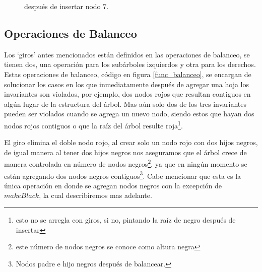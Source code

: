 \begin{figure}
\centering
\captionsetup{justification=centering}
\caption{{\Arn} después de insertar nodo 7.}
\label{arbolRB_3}
\end{figure}
\subsection{Operaciones de Balanceo}
Los `giros' antes mencionados están definidos en las operaciones de balanceo, se tienen dos, una
operaci\'on para los subárboles izquierdos y otra para los derechos. Estas operaciones de balanceo,
c\'odigo en figura \ref{func_balanceo}, se encargan de solucionar los casos en los que
inmediatamente después de agregar una hoja los invariantes son violados, por ejemplo, dos nodos
rojos que resultan contiguos en algún lugar de la estructura del \'arbol. Mas a\'un solo dos de los
tres invariantes pueden ser violados cuando se agrega un nuevo nodo, siendo estos que hayan dos
nodos rojos contiguos o que la raíz del árbol resulte roja\footnote{esto no se arregla con giros,
si no, pintando la raíz de negro después de insertar}.

El giro elimina el doble nodo rojo, al crear solo un nodo rojo con dos hijos negros, de igual
manera al tener dos hijos negros nos aseguramos que el árbol crece de manera controlada en n\'umero
de nodos negros\footnote{este n\'umero de nodos negros se conoce como altura negra}, ya que en
ningún momento se están agregando dos nodos negros contiguos\footnote{Nodos padre e hijo negros
después de balancear.}. Cabe mencionar que esta es la única operación en donde se agregan nodos
negros con la excepción de $makeBlack$, la cual describiremos mas adelante.

